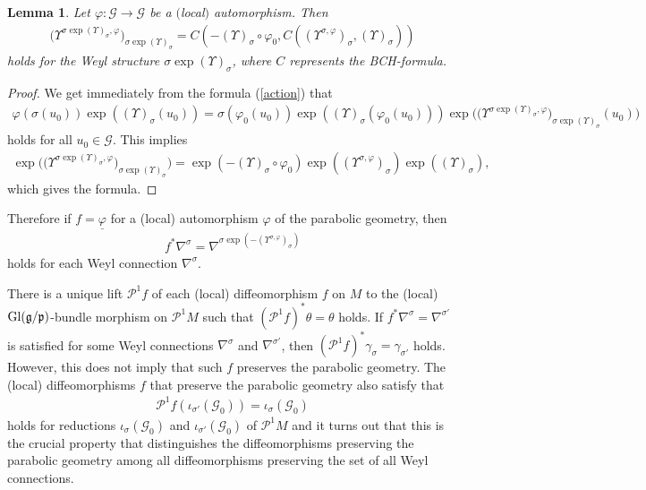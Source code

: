 \documentclass[10pt,a4paper]{amsart}
\newcommand{\si}{\sigma}
\newcommand{\un}{\underline}
\newcommand{\ba}{\mathcal{G}}
\newcommand{\va}{\varphi}
\newcommand{\fg}{\mathfrak g}
\newcommand{\fp}{\mathfrak p}
\newcommand{\U}{\Upsilon}
\numberwithin{equation}{section}
\newtheorem{Lemma}[Theorem]{Lemma}
\begin{document}
\begin{Lemma} \label{lem3}
Let $\va\colon \ba \to \ba$ be a $($local$)$ automorphism. Then
\begin{gather} \label{2.4.}
\big(\U^{\si\exp (\U)_\si,\va}\big)_{\si\exp (\U)_\si}=C(-(\U)_\si\circ\va_0,C((\U^{\si,\va})_\si,(\U)_\si))
\end{gather}
holds for the Weyl structure $\si\exp (\U)_\si$, where $C$ represents the BCH-formula.
\end{Lemma}
\begin{proof}
We get immediately from the formula (\ref{action}) that
 \begin{gather*} \va(\si(u_0))\exp((\U)_\si(u_0))=\si(\va_0(u_0))\exp((\U)_\si(\va_0(u_0)))\exp\big(\big(\U^{\si\exp (\U)_\si,\va}\big)_{\si\exp (\U)_\si}(u_0)\big)
\end{gather*} holds for all $u_0\in \ba$. This implies \begin{gather*}\exp\big(\big(\U^{\si\exp (\U)_\si,\va}\big)_{\si\exp (\U)_\si}\big)=\exp(-(\U)_\si\circ \va_0)\exp((\U^{\si,\va})_\si)\exp((\U)_\si),\end{gather*} which gives the formula.
\end{proof}

Therefore if $f=\un{\va}$ for a (local) automorphism $\va$ of the parabolic geometry, then
\begin{gather*}f^*\nabla^\si=\nabla^{\si \exp(-(\U^{\si,\va})_\si)}\end{gather*}
holds for each Weyl connection $\nabla^\si$.

There is a unique lift $\mathcal{P}^1f$ of each (local) dif\/feomorphism $f$ on $M$ to the (local) ${\rm Gl}(\fg/\fp)$-bundle morphism on $\mathcal{P}^1M$ such that $(\mathcal{P}^1f)^*\theta=\theta$ holds. If $f^*\nabla^{\si}=\nabla^{\si'}$ is satisf\/ied for some Weyl connections $\nabla^{\si}$ and $\nabla^{\si'}$, then $(\mathcal{P}^1f)^*\gamma_\si=\gamma_{\si'}$ holds. However, this does not imply that such $f$ preserves the parabolic geometry. The (local) dif\/feomorphisms $f$ that preserve the parabolic geometry also satisfy that
\begin{gather*}\mathcal{P}^1f(\iota_{\si'}(\ba_0))=\iota_\si(\ba_0)\end{gather*} holds for reductions $\iota_\si(\ba_0)$ and $\iota_{\si'}(\ba_0)$ of $\mathcal{P}^1M$ and it turns out that this is the crucial property that distinguishes the dif\/feo\-mor\-phisms preserving the parabolic geometry among all dif\/feo\-mor\-phisms preserving the set of all Weyl connections.
\end{document}
